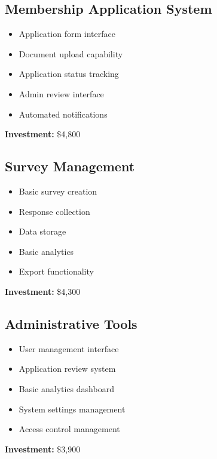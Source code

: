 \documentclass[11pt,a4paper]{article}
\begin{document}
\subsection{Membership Application System}
\begin{tcolorbox}[colback=white,colframe=primaryBlue!20,title=Module Details]
\begin{itemize}[leftmargin=*]
    \item Application form interface
    \item Document upload capability
    \item Application status tracking
    \item Admin review interface
    \item Automated notifications
\end{itemize}
\textbf{Investment:} \$4,800
\end{tcolorbox}

\subsection{Survey Management}
\begin{tcolorbox}[colback=white,colframe=primaryBlue!20,title=Module Details]
\begin{itemize}[leftmargin=*]
    \item Basic survey creation
    \item Response collection
    \item Data storage
    \item Basic analytics
    \item Export functionality
\end{itemize}
\textbf{Investment:} \$4,300
\end{tcolorbox}

\subsection{Administrative Tools}
\begin{tcolorbox}[colback=white,colframe=primaryBlue!20,title=Module Details]
\begin{itemize}[leftmargin=*]
    \item User management interface
    \item Application review system
    \item Basic analytics dashboard
    \item System settings management
    \item Access control management
\end{itemize}
\textbf{Investment:} \$3,900
\end{tcolorbox}
\end{document}
